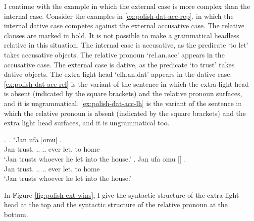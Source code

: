 I continue with the example in which the external case is more complex than the internal case.
Consider the examples in \ref{ex:polish-dat-acc-rep}, in which the internal dative case competes against the external accusative case. The relative clauses are marked in bold. It is not possible to make a grammatical headless relative in this situation.
The internal case is accusative, as the predicate  `to let' takes accusative objects. The relative pronoun  `\ac{rel}.\ac{an}.\ac{acc}' appears in the accusative case.
The external case is dative, as the predicate  `to trust' takes dative objects. The extra light head  `\ac{elh}.\ac{an}.\ac{dat}' appears in the dative case.
\ref{ex:polish-dat-acc-rel} is the variant of the sentence in which the extra light head is absent (indicated by the square brackets) and the relative pronoun surfaces, and it is ungrammatical.
\ref{ex:polish-dat-acc-lh} is the variant of the sentence in which the relative pronoun is absent (indicated by the square brackets) and the extra light head surfaces, and it is ungrammatical too.

\ex.\label{ex:polish-dat-acc-rep}
\ag. *Jan ufa [omu]     .\\
Jan trust.\scsub{[dat]} .. .. ever let.\scsub{[acc]} to home\\
`Jan trusts whoever he let into the house.' \label{ex:polish-dat-acc-rel}
\bg. Jan ufa omu []    .\\
Jan trust.\scsub{[dat]} .. .. ever let.\scsub{[acc]} to home\\
`Jan trusts whoever he let into the house.' \label{ex:polish-dat-acc-lh}

In Figure \ref{fig:polish-ext-wins}, I give the syntactic structure of the extra light head at the top and the syntactic structure of the relative pronoun at the bottom.

